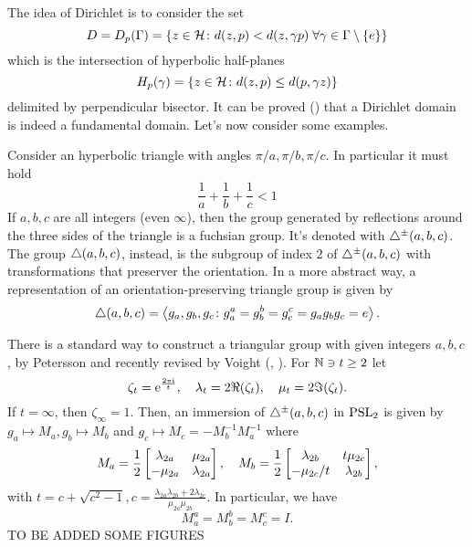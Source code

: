 The idea of Dirichlet is to consider the set
\[
D=D_{p}(\Gamma)=\left\{
z\in\mathcal{H}\colon d(z,p)<d(z,\gamma p)\;\forall\gamma\in\Gamma\setminus\{e\}
\right\}
\]
which is the intersection of hyperbolic half-planes 
\[
H_{p}(\gamma)=\left\{
z\in\mathcal{H}\colon d(z,p)\leq d(p,\gamma z)
\right\}
\]
delimited by perpendicular bisector. It can be proved (\cite{Katok:groups}) that a Dirichlet domain is indeed a fundamental domain. Let's now consider some examples.

\begin{nese}
Consider an hyperbolic triangle with angles $\pi/a,\pi/b,\pi/c$. In particular it must hold
\[
\frac{1}{a}+\frac{1}{b}+\frac{1}{c}<1
\]
If $a,b,c$ are all integers (even $\infty$), then the group generated by reflections around the three sides of the triangle is a fuchsian group. It's denoted with $\bigtriangleup^{\pm}(a,b,c)$. The group $\bigtriangleup(a,b,c)$, instead, is the subgroup of index $2$ of $\bigtriangleup^{\pm}(a,b,c)$ with transformations that preserver the orientation. In a more abstract way, a representation of an orientation-preserving triangle group is given by
\[
\bigtriangleup(a,b,c)=\left< 
g_{a},g_{b},g_{c}\colon g_{a}^{a}=g_{b}^{b}=g_{c}^{c}=g_{a}g_{b}g_{c}=e
\right>.
\]
\end{nese}

There is a standard way to construct a triangular group with given integers $a,b,c$, by Petersson and recently revised by Voight (\cite{Voight:triang}, \cite{Peter:triang}). For $\mathbb{N}\ni t\geq 2$ let 
\[
\zeta_{t}=\mathrm{e}^{\frac{2\pi\mathrm{i}}{t}},\quad \lambda_{t}=2\Re(\zeta_{t}),\quad \mu_{t}=2\Im(\zeta_{t}). 
\]
If $t=\infty$, then $\zeta_{\infty}=1$. Then, an immersion of $\bigtriangleup^{\pm}(a,b,c)$ in $\operatorname{PSL}_{2}$ is given by $g_{a}\mapsto M_{a}, g_{b}\mapsto M_{b}$ and $g_{c}\mapsto M_{c}=-M_{b}^{-1}M_{a}^{-1}$ where 
\[
M_{a}=\frac{1}{2}\begin{bmatrix} \lambda_{2a}&\mu_{2a}\\-\mu_{2a}&\lambda_{2a} \end{bmatrix},\quad
M_{b}=\frac{1}{2}\begin{bmatrix} \lambda_{2b}&t\mu_{2c}\\-\mu_{2c}/t&\lambda_{2b} \end{bmatrix},
\]
with $t=c+\sqrt{c^{2}-1}, c=\frac{\lambda_{2a}\lambda_{2b}+2\lambda_{2c}}{\mu_{2a}\mu_{2b}}$. In particular, we have
\[
M_{a}^{a}=M_{b}^{b}=M_{c}^{c}=I.
\]
TO BE ADDED SOME FIGURES

